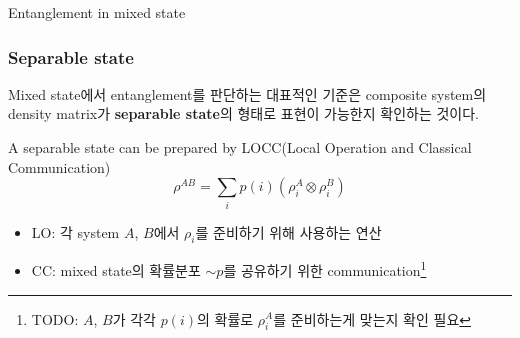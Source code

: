 \documentclass[9pt]{beamer}
\begin{document}
    \begin{section}{Entanglement in mixed state}
        \begin{frame}
            \frametitle{Separable state}
            Mixed state에서 entanglement를 판단하는 대표적인 기준은 composite system의 density matrix가 \textbf{separable state}의 형태로 표현이 가능한지 확인하는 것이다.
            \begin{definition}
                A separable state can be prepared by LOCC(Local Operation and Classical Communication)
                \begin{equation*}
                    \rho^{AB} = \sum_i p(i) \left( \rho_i^A \otimes \rho_i^B \right)
                \end{equation*}
                \begin{itemize}
                    \item LO: 각 system $A$, $B$에서 $\rho_i$를 준비하기 위해 사용하는 연산
                    \item CC: mixed state의 확률분포 $\sim p$를 공유하기 위한 communication\footnote{TODO: $A$, $B$가 각각 $p(i)$의 확률로 $\rho_i^A$를 준비하는게 맞는지 확인 필요}
                \end{itemize}
            \end{definition}
        \end{frame}
        

\end{section}
\end{document}
